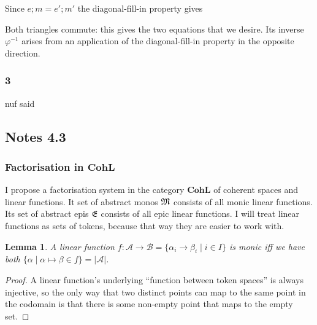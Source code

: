 \documentclass{article}
\newtheorem{lemma}{Lemma}
\newcommand{\mbf}{\mathbf}
\begin{document}
Since $e;m = e';m'$ the diagonal-fill-in property gives


Both triangles commute: this gives the two equations that we desire. Its inverse $\varphi^{-1}$ 
arises from an application of the 
diagonal-fill-in property in the opposite direction.

\subsubsection*{3}


nuf said

\subsection*{Notes 4.3}

\subsubsection*{Factorisation in $\mbf{CohL}$}

I propose a factorisation system in the category $\mbf{CohL}$ of coherent spaces and linear functions.
It set of abstract monos $\frak M$ consists of all monic linear functions. Its set of abstract epis $\frak E$
consists of all epic linear functions. I will treat linear functions as sets of tokens, because that way
they are easier to work with.

\begin{lemma}
A linear function $f : \mathcal A \to \mathcal B = \{ \alpha_i \to \beta_i \mid i \in I \}$ is monic iff 
we have both $\{ \alpha \mid \alpha \mapsto \beta \in f \} = |\mathcal A|$.  
\end{lemma}

\begin{proof}
A linear function's underlying ``function between token spaces'' is always injective, so
the only way that two distinct points can map to the same point in the codomain is that 
there is some non-empty point that maps to the empty set. 
\end{proof}
\end{document}
